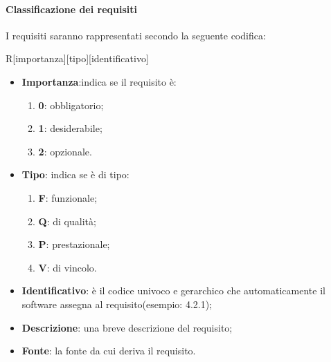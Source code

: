 		\paragraph{Classificazione  dei requisiti}
		I requisiti saranno rappresentati secondo la seguente codifica:
		\begin{center}
			R[importanza][tipo][identificativo]
		\end{center}
		\begin{itemize}
			\item \textbf{Importanza}:indica se il requisito è:
			\begin{enumerate}
				\item \textbf{0}: obbligatorio;
				\item \textbf{1}: desiderabile;
				\item \textbf{2}: opzionale.
			\end{enumerate}
			\item \textbf{Tipo}: indica se è di tipo:
			\begin{enumerate}
				\item \textbf{F}: funzionale;
				\item \textbf{Q}: di qualità;
				\item \textbf{P}: prestazionale;
				\item \textbf{V}: di vincolo.
			\end{enumerate}
			\item \textbf{Identificativo}: è il codice univoco e gerarchico che automaticamente il software assegna al requisito(esempio: 4.2.1);
			\item \textbf{Descrizione}: una breve descrizione del requisito;
			\item \textbf{Fonte}: la fonte da cui deriva il requisito.
		\end{itemize}
